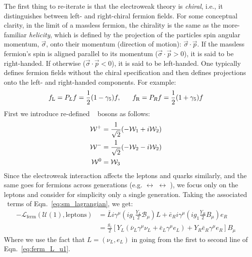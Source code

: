 The first thing to re-iterate is that the electroweak theory is \textit{chiral}, i.e., it distinguishes
between left- and right-chiral fermion fields. For some conceptual clarity, in the limit of
a massless fermion, the chirality is the same as the more-familiar \textit{helicity}, which
is defined by the projection of the particles spin angular momentum, $\vec{\sigma}$, onto their momentum (direction of motion): $\vec{\sigma}\cdot \vec{p}$. If the massless fermion's spin
is aligned parallel to its momentum ($\vec{\sigma}\cdot \vec{p} >0$), it is said to be right-handed. If otherwise ($\vec{\sigma}\cdot \vec{p} <0$), it is said to be left-handed. One typically defines
fermion fields without the chiral specification and then defines projections onto the left-
and right-handed components. For example:
\begin{equation*}
	f_{\text{L}} = P_L f = \frac{1}{2}(1- \gamma_5)f, \hspace{0.6cm} f_{\text{R}} = P_R f = \frac{1}{2}(1+\gamma_5)f
	\label{eq:chiral_projection}
\end{equation*}
First we introduce re-defined \fieldW~ bosons as follows:
\begin{align}
	\mathcal{W}^+ &= \frac{1}{\sqrt{2}} ( -\mathcal{W}_1 + i\mathcal{W}_2)\notag \\
	\mathcal{W}^- &= \frac{1}{\sqrt{2}} ( -\mathcal{W}_2 - i\mathcal{W}_2) \label{eq:w_redefine} \\ 
	\mathcal{W}^0 &= \mathcal{W}_3 \notag
\end{align}
Since the electroweak interaction affects the leptons and quarks similarly, and the same goes for
fermions across generations (e.g. \fieldEl $\leftrightarrow$ \fieldMul $\leftrightarrow$ \fieldTaul),
we focus only on the leptons and consider for simplicity only a single generation.
Taking the associated \Uone~terms of Eqn.~\ref{eq:sm_lagrangian}, we get:
\begin{align}
    -\mathcal{L}_{\text{ferm}}(\mathcal{U}(1), \text{leptons}) &= \bar{L} i \gamma^{\mu} (i g_1 \frac{Y_L}{2} \mathcal{B}_{\mu})L + \bar{e}_R i \gamma^{\mu} (i g_1 \frac{Y_R}{2} B_{\mu}) e_R \nonumber \\
    &= \frac{g_1}{2} [ Y_L ( \bar{\nu}_L \gamma^{\mu} \nu_L + \bar{e}_L \gamma^{\mu} e_L) + Y_R \bar{e}_R \gamma^{\mu} e_R ] B_{\mu}
    \label{eq:ferm_L_u1}
\end{align}
Where we use the fact that $L = (\nu_L, e_L)$ in going from the first to second line of Eqn.~\ref{eq:ferm_L_u1}.
